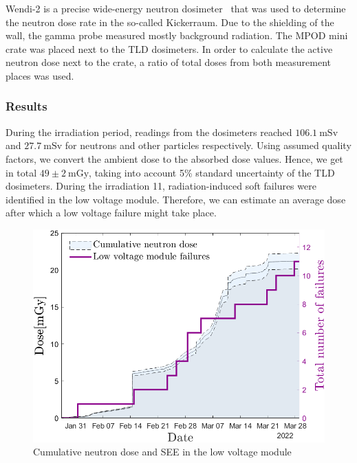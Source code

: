 Wendi-2 is a precise wide-energy neutron dosimeter~\cite{wendi} that was used to determine the neutron dose rate in the so-called Kickerraum. Due to the shielding of the wall, the gamma probe measured mostly background radiation. The MPOD mini crate was placed next to the TLD dosimeters. In order to calculate the active neutron dose next to the crate, a ratio of total doses from both measurement places was used. 
\newpage
\subsubsection{Results}
During the irradiation period, readings from the dosimeters reached $106.1\mathrm{\ mSv}$ and $27.7\mathrm{\ mSv}$ for neutrons and other particles respectively.
Using assumed quality factors, we convert the ambient dose to the absorbed dose values. Hence, we get in total $49\pm{2}\mathrm{\ mGy}$, taking into account 5\% standard uncertainty of the TLD dosimeters. During the irradiation 11, radiation-induced soft failures were identified in the low voltage module. Therefore, we can estimate an average dose after which a low voltage failure might take place.
\begin{figure}[!h]
    \centering
    \includegraphics[width=0.6\columnwidth]{Chapter4/images/LV_failure_and_neutronsrate.png}
    \caption{Cumulative neutron dose and SEE in the low voltage module}
    \label{fig:lv_neutrons}
\end{figure}
